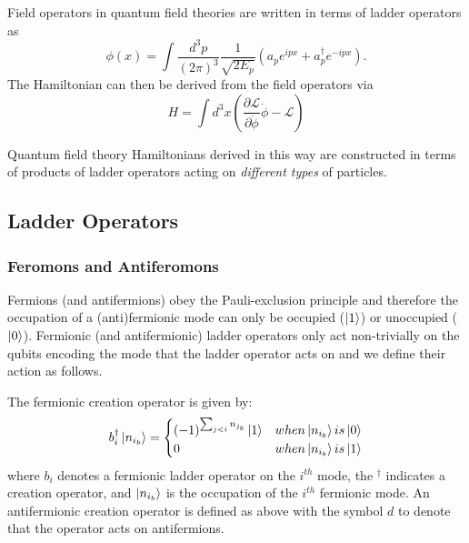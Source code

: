 Field operators  in quantum field theories are written in terms of ladder operators as
\begin{equation}
    \phi(x) = \int \frac{d^3p}{(2\pi)^3}\frac{1}{\sqrt{2E_p}}\left(a_p e^{ipx} + a_p^\dagger e^{-ipx}\right).
\end{equation}
The Hamiltonian can then be derived from the field operators via 
\begin{equation}
    H = \int d^3x \left(\frac{\partial \mathcal{L}}{\partial \dot{\phi}}\dot{\phi} - \mathcal{L} \right)
\end{equation}

Quantum field theory Hamiltonians derived in this way are constructed in terms of products of ladder operators acting on \emph{different types} of particles.

\subsection{Ladder Operators}
\label{subsec:operators}

\subsubsection{Feromons and Antiferomons}


Fermions (and antifermions) obey the Pauli-exclusion principle  and therefore the occupation of a (anti)fermionic mode can only be occupied ($\ket{1}$) or unoccupied ($\ket{0}$).
Fermionic (and antifermionic) ladder operators only act non-trivially on the qubits encoding the mode that the ladder operator acts on and we define their action as follows.

The fermionic creation operator is given by:
\begin{equation}
    b_i^\dagger \ket{n_{i_b}} = 
    \begin{cases} 
        (-1)^{\sum_{j < i} n_{j_b}} \ket{1}  & when \ket{n_{i_b}} is \ket{0} \\
        0 & when \ket{n_{i_b}} is \ket{1}
    \end{cases}
\end{equation}
where $b_i$ denotes a fermionic ladder operator on the $i^{th}$ mode, the $^\dagger$ indicates a creation operator, and $\ket{n_{i_b}}$ is the occupation of the $i^{th}$ fermionic mode.
An antifermionic creation operator is defined as above with the symbol $d$ to denote that the operator acts on antifermions.

